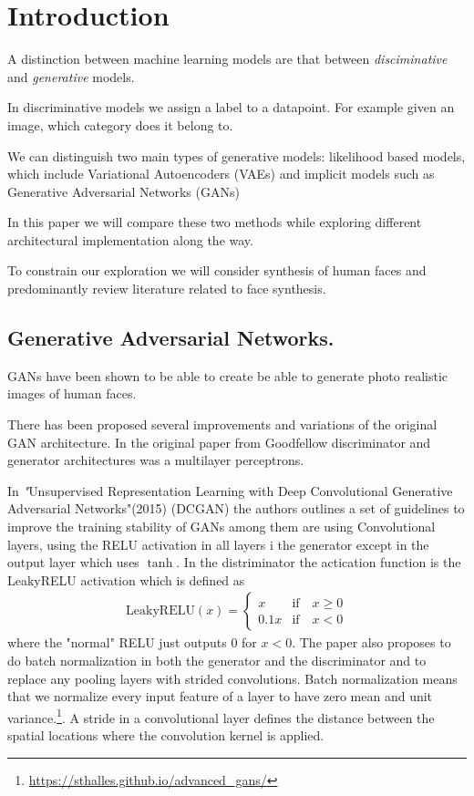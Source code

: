 \chapter{Introduction}


A distinction between machine learning models are that between \emph{disciminative} and \emph{generative} models.

In discriminative models we assign a label to a datapoint. For example given an image, which category does it belong to.

We can distinguish two main types of generative models: likelihood based models, which include Variational Autoencoders (VAEs) and
implicit models such as Generative Adversarial Networks (GANs) \cite{vqvae2}

In this paper we will compare these two methods while exploring different architectural implementation along the way.

To constrain our exploration we will consider synthesis of human faces and predominantly review literature related to face synthesis.

\section{Generative Adversarial Networks.}
GANs have been shown to be able to create be able to generate photo realistic images of human faces.\cite{progan}

There has been proposed several improvements and variations of the original GAN architecture. In the original paper from Goodfellow discriminator and generator architectures was a multilayer perceptrons.\cite{gan}

In \textit"{Unsupervised Representation Learning with Deep Convolutional Generative Adversarial Networks"}(2015) (DCGAN)\cite{dcgan} the authors outlines a set of guidelines to  improve the training stability of GANs among them are using Convolutional layers, using the RELU activation in all layers i the generator except in the output layer which uses $\tanh$. In the distriminator the actication function is  the LeakyRELU activation which is defined as
\begin{align}
  \text{LeakyRELU}(x) =
  \begin{cases}
    x & \text{if}\quad x\geq0\\
    0.1x & \text{if}\quad x<0
  \end{cases}
\end{align}
where the "normal" RELU just outputs $0$ for $x<0$. The paper also proposes to do batch normalization in both the generator and the discriminator and to replace any pooling layers with strided convolutions. Batch normalization means that we normalize every input feature of a layer to have zero mean and unit variance.\footnote{\url{https://sthalles.github.io/advanced_gans/}}. A stride in a convolutional layer defines the distance between the spatial locations where the convolution kernel is applied.

